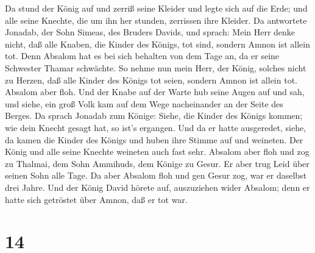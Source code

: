  Da stund der König auf und zerriß seine Kleider und legte
sich auf die Erde; und alle seine Knechte, die um ihn her stunden,
zerrissen ihre Kleider.  Da antwortete Jonadab, der Sohn
Simeas, des Bruders Davids, und sprach: Mein Herr denke nicht, daß alle
Knaben, die Kinder des Königs, tot sind, sondern Amnon ist allein tot.
Denn Absalom hat es bei sich behalten von dem Tage an, da er seine
Schwester Thamar schwächte.  So nehme nun mein Herr, der
König, solches nicht zu Herzen, daß alle Kinder des Königs tot seien,
sondern Amnon ist allein tot.  Absalom aber floh. Und der
Knabe auf der Warte hub seine Augen auf und sah, und siehe, ein groß
Volk kam auf dem Wege nacheinander an der Seite des Berges.
 Da sprach Jonadab zum Könige: Siehe, die Kinder des Königs
kommen; wie dein Knecht gesagt hat, so ist's ergangen.  Und
da er hatte ausgeredet, siehe, da kamen die Kinder des Königs und huben
ihre Stimme auf und weineten. Der König und alle seine Knechte weineten
auch fast sehr.  Absalom aber floh und zog zu Thalmai, dem
Sohn Ammihuds, dem Könige zu Gesur. Er aber trug Leid über seinen Sohn
alle Tage.  Da aber Absalom floh und gen Gesur zog, war er
daselbst drei Jahre.  Und der König David hörete auf,
auszuziehen wider Absalom; denn er hatte sich getröstet über Amnon, daß
er tot war.

\hypertarget{section-13}{%
\section{14}\label{section-13}}

